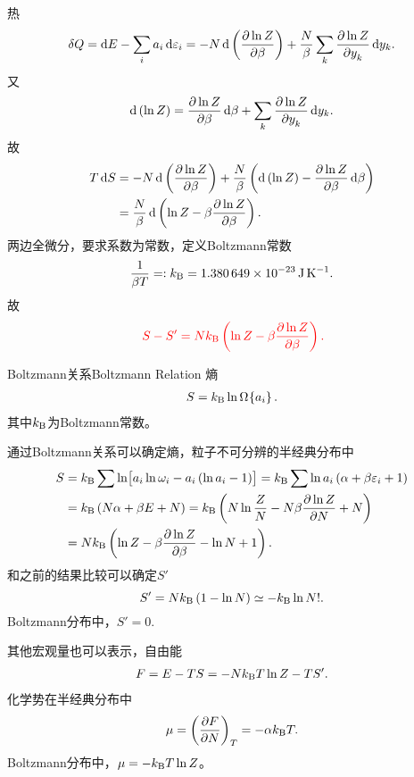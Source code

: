 热
\[
	\delta Q=\d E-\sum_ia_i\d\varepsilon_i=-N\d\kh{\pv{\ln Z}\beta}+\frac N\beta\sum_k\pv{\ln Z}{y_k}\d y_k.
\]
又
\[
	\d\kh{\ln Z}=\pv{\ln Z}\beta\d\beta+\sum_k\pv{\ln Z}{y_k}\d y_k.
\]
故
\begin{align*}
	T\d S & =-N\d\kh{\pv{\ln Z}\beta}+\frac N\beta\kh{\d\kh{\ln Z}-\pv{\ln Z}\beta\d\beta} \\
	      & =\frac N\beta\d\kh{\ln Z-\beta\pv{\ln Z}\beta}.
\end{align*}
两边全微分，要求系数为常数，定义Boltzmann常数
\[
	\frac1{\beta T}=:\kB=\SI{1.380649e-23}{\J\per\K}.
\]
故
\begin{align}
	\;\textcolor{red}{S-S'=Nk_{\mathrm B}\left(\ln Z-\beta\frac{\partial^{\;\!\!}\ln Z}{\partial \beta^{\;\!\!}}\right).}
\end{align}
\begin{theorem}{Boltzmann关系}{Boltzmann Relation}
	熵
	\begin{align}
		S=k_{\mathrm B}\ln\Omega_{\mathrm{\,\!}}\!\left\{a_i\right\}.
	\end{align}
	其中$k_{\mathrm B}$为Boltzmann常数。
\end{theorem}
通过Boltzmann关系可以确定熵，粒子不可分辨的半经典分布中
\begin{align}\notag
	S & =\kB\sum\ln\bigfkh{a_i\ln\omega_i-a_i\kh{\ln a_i-1}}=\kB\sum\ln a_i\kh{\alpha+\beta\varepsilon_i+1} \\\notag
	  & =\kB\kh{N\alpha+\beta E+N}=\kB\kh{N\ln\frac ZN-N\beta\pv{\ln Z}N+N}                              \\
	  & =N\kB\kh{\ln Z-\beta\pv{\ln Z}\beta-\ln N+1}.
\end{align}
和之前的结果比较可以确定$S'$
\[
	S'=Nk_{\mathrm B}\left(1-\ln N\right)\simeq-k_{\mathrm B}\ln N!.
\]
Boltzmann分布中，$S'=0.$

其他宏观量也可以表示，自由能
\begin{align}
	F=E-TS=-Nk_{\mathrm B} T\ln Z-TS'.
\end{align}
化学势在半经典分布中
\[
	\mu=\left(\frac{\partial^{\;\!\!}F}{\partial N^{\;\!\!}}\right)_T=-\alpha k_{\mathrm B} T.
\]
Boltzmann分布中，$\mu=-k_{\mathrm B} T\ln Z$。
